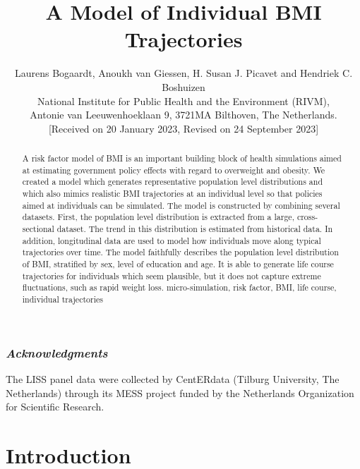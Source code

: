 \documentclass{imammb}
\numberwithin{equation}{section}
\begin{document}
\title{A Model of Individual BMI Trajectories}
\author{ {\sc Laurens Bogaardt, Anoukh van Giessen, H. Susan J. Picavet and Hendriek C. Boshuizen}\\[2pt]
National Institute for Public Health and the Environment (RIVM),\\
Antonie van Leeuwenhoeklaan 9, 3721MA Bilthoven, The Netherlands.\\[6pt]
{\rm [Received on 20 January 2023, Revised on 24 September 2023]}\vspace*{6pt}}
\pagestyle{headings}
\maketitle

\begin{abstract}
{A risk factor model of BMI is an important building block of health simulations aimed at estimating government policy effects with regard to overweight and obesity. We created a model which generates representative population level distributions and which also mimics realistic BMI trajectories at an individual level so that policies aimed at individuals can be simulated. The model is constructed by combining several datasets. First, the population level distribution is extracted from a large, cross-sectional dataset. The trend in this distribution is estimated from historical data. In addition, longitudinal data are used to model how individuals move along typical trajectories over time. The model faithfully describes the population level distribution of BMI, stratified by sex, level of education and age. It is able to generate life course trajectories for individuals which seem plausible, but it does not capture extreme fluctuations, such as rapid weight loss.}
{micro-simulation, risk factor, BMI, life course, individual trajectories}
\end{abstract}

\subsubsection*{\textit{Acknowledgments}}
The LISS panel data were collected by CentERdata (Tilburg University, The Netherlands) through its MESS project funded by the Netherlands Organization for Scientific Research.

\section{Introduction}
\end{document}
